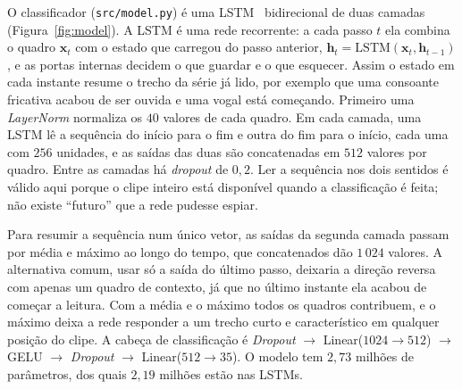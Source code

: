 \documentclass[11pt,a4paper]{article}
\begin{document}
O classificador (\texttt{src/model.py}) é uma LSTM~\cite{hochreiter1997} bidirecional de duas camadas (Figura~\ref{fig:model}). A LSTM é uma rede recorrente: a cada passo $t$ ela combina o quadro $\mathbf{x}_t$ com o estado que carregou do passo anterior, $\mathbf{h}_t = \mathrm{LSTM}(\mathbf{x}_t, \mathbf{h}_{t-1})$, e as portas internas decidem o que guardar e o que esquecer. Assim o estado em cada instante resume o trecho da série já lido, por exemplo que uma consoante fricativa acabou de ser ouvida e uma vogal está começando. Primeiro uma \textit{LayerNorm} normaliza os $40$ valores de cada quadro. Em cada camada, uma LSTM lê a sequência do início para o fim e outra do fim para o início, cada uma com $256$ unidades, e as saídas das duas são concatenadas em $512$ valores por quadro. Entre as camadas há \textit{dropout} de $0{,}2$. Ler a sequência nos dois sentidos é válido aqui porque o clipe inteiro está disponível quando a classificação é feita; não existe ``futuro'' que a rede pudesse espiar.

Para resumir a sequência num único vetor, as saídas da segunda camada passam por média e máximo ao longo do tempo, que concatenados dão $1\,024$ valores. A alternativa comum, usar só a saída do último passo, deixaria a direção reversa com apenas um quadro de contexto, já que no último instante ela acabou de começar a leitura. Com a média e o máximo todos os quadros contribuem, e o máximo deixa a rede responder a um trecho curto e característico em qualquer posição do clipe. A cabeça de classificação é \textit{Dropout} $\to$ Linear($1024 \to 512$) $\to$ GELU $\to$ \textit{Dropout} $\to$ Linear($512 \to 35$). O modelo tem $2{,}73$ milhões de parâmetros, dos quais $2{,}19$ milhões estão nas LSTMs.
\end{document}
